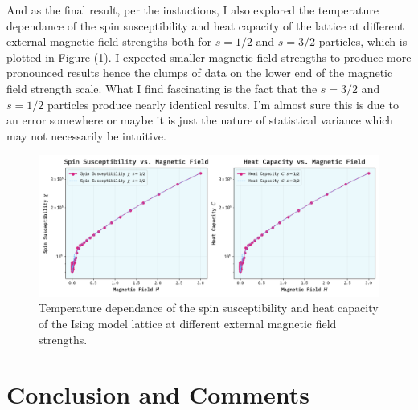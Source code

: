 \documentclass[10pt, titlepage, a4paper]{article}
\begin{document}
And as the final result, per the instuctions, I also explored the temperature dependance of the spin susceptibility and heat capacity of the
lattice at different external magnetic field strengths both for $s=1/2$ and $s=3/2$ particles, which is plotted in Figure (\ref{fig:ising-H}).
I expected smaller magnetic field strengths to produce more pronounced results hence the clumps of data on the lower end of the
magnetic field strength scale. What I find fascinating is the fact that the $s=3/2$ and $s=1/2$ particles produce nearly identical results.
I'm almost sure this is due to an error somewhere or maybe it is just the nature of statistical variance which may not necessarily be
intuitive.

\begin{figure}[H]
    \centering
    \includegraphics[width=.95\textwidth]{../IsingModel/Images/H-analysis.png}
    \caption{Temperature dependance of the spin susceptibility and heat capacity of the Ising model lattice at different external magnetic field strengths.}
    \label{fig:ising-H}
\end{figure}


\section{Conclusion and Comments}




\end{document}
